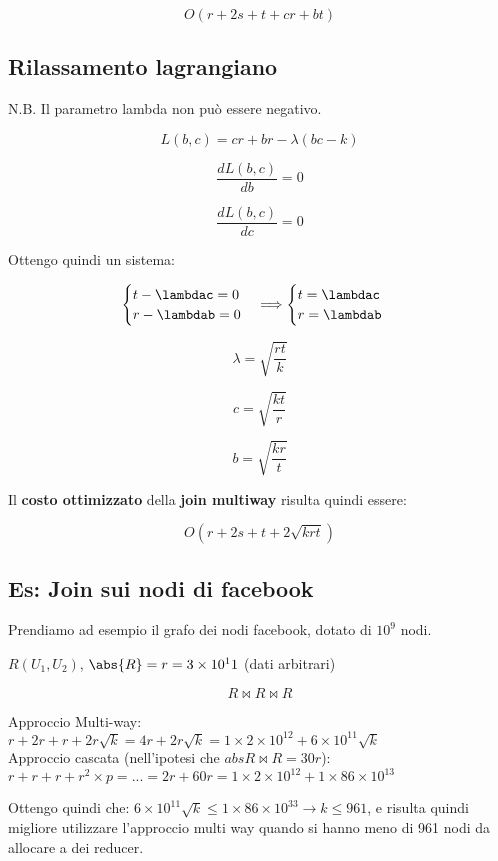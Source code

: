 \documentclass[\main/main.tex]{subfiles}
\begin{document}
\[
	O(r+2s+t+cr+bt)
\]

\subsection{Rilassamento lagrangiano}
N.B. Il parametro lambda non può essere negativo.

\[
	L(b,c) = cr+br - \lambda(bc-k)
\]

\[
	\dfrac{dL(b,c)}{db} = 0
\]

\[
	\dfrac{dL(b,c)}{dc} = 0
\]

Ottengo quindi un sistema:

\[
	\begin{cases}
		t - \lambdac = 0 \\
		r - \lambdab = 0 \\
	\end{cases}
	\Longrightarrow
	\begin{cases}
		t = \lambdac \\
		r = \lambdab \\
	\end{cases}
\]

\[
	\lambda = \sqrt{\dfrac{rt}{k}}
\]

\[
	c = \sqrt{\dfrac{kt}{r}}
\]

\[
	b = \sqrt{\dfrac{kr}{t}}
\]

Il \textbf{costo ottimizzato} della \textbf{join multiway} risulta quindi essere:

\[
	O(r+2s+t+2\sqrt{krt})
\]

\subsection{Es: Join sui nodi di facebook}
Prendiamo ad esempio il grafo dei nodi facebook, dotato di $10^9$ nodi.

$R(U_1, U_2)$, $\abs{R} = r = 3\times10^11$ (dati arbitrari)

\[
	R\Join R \Join R
\]

Approccio Multi-way: $r+2r + r + 2r\sqrt{k} = 4r + 2r\sqrt{k} = 1\times 2\times 10^12 + 6\times 10^11 \sqrt{k}$
\\
Approccio cascata (nell'ipotesi che $abs{R \Join R} = 30r$): $r + r + r + r^2\times p = ... = 2r + 60r = 1 \times 2 \times 10^12 + 1\times 86 \times 10^13$

Ottengo quindi che: $6\times 10^11 \sqrt{k} \leq 1\times 86 \times 10^33 \longrightarrow k \leq 961$, e risulta quindi migliore utilizzare l'approccio multi way quando si hanno meno di 961 nodi da allocare a dei reducer.
\end{document}
